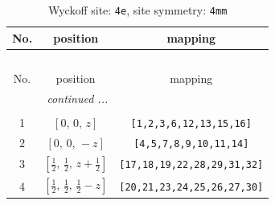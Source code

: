 \documentclass[fleqn,8pt]{jsarticle}
\begin{document}
\renewcommand{\arraystretch}{1.2}
\begin{longtable}{ccc}
\caption{Wyckoff site: {\tt 4e}, site symmetry: {\tt 4mm}}
 \\
 \hline \hline
No. & position & mapping \\ \hline \endfirsthead

\multicolumn{2}{l}{\tablename\ \thetable{}} \\
 \hline \hline
No. & position & mapping \\ \hline \endhead

 \hline \hline
\multicolumn{2}{r}{\footnotesize\it continued ...} \\ \endfoot

 \hline \hline
\multicolumn{2}{r}{} \\ \endlastfoot

1 & $\left[ 0,\, 0,\, z \right]$ & {\tt [1,2,3,6,12,13,15,16]} \\ \hline
2 & $\left[ 0,\, 0,\, - z \right]$ & {\tt [4,5,7,8,9,10,11,14]} \\ \hline
3 & $\left[ \frac{1}{2},\, \frac{1}{2},\, z + \frac{1}{2} \right]$ & {\tt [17,18,19,22,28,29,31,32]} \\ \hline
4 & $\left[ \frac{1}{2},\, \frac{1}{2},\, \frac{1}{2} - z \right]$ & {\tt [20,21,23,24,25,26,27,30]} \\
\end{longtable}
\renewcommand{\arraystretch}{1.2}
\end{document}
